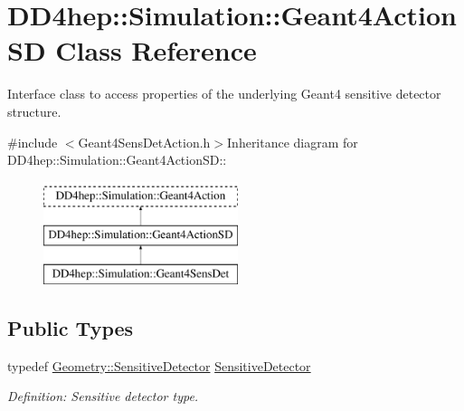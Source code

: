 \hypertarget{class_d_d4hep_1_1_simulation_1_1_geant4_action_s_d}{
\section{DD4hep::Simulation::Geant4ActionSD Class Reference}
\label{class_d_d4hep_1_1_simulation_1_1_geant4_action_s_d}
}


Interface class to access properties of the underlying Geant4 sensitive detector structure.  


{\ttfamily \#include $<$Geant4SensDetAction.h$>$}Inheritance diagram for DD4hep::Simulation::Geant4ActionSD::\begin{figure}[H]
\begin{center}
\leavevmode
\includegraphics[height=3cm]{class_d_d4hep_1_1_simulation_1_1_geant4_action_s_d}
\end{center}
\end{figure}
\subsection*{Public Types}
\begin{DoxyCompactItemize}
\item 
typedef \hyperlink{class_d_d4hep_1_1_geometry_1_1_sensitive_detector}{Geometry::SensitiveDetector} \hyperlink{class_d_d4hep_1_1_simulation_1_1_geant4_action_s_d_a8a292947ea3f9b419728ef729a7e3fae}{SensitiveDetector}
\begin{DoxyCompactList}\small\item\em Definition: Sensitive detector type. \item\end{DoxyCompactList}\end{DoxyCompactItemize}
